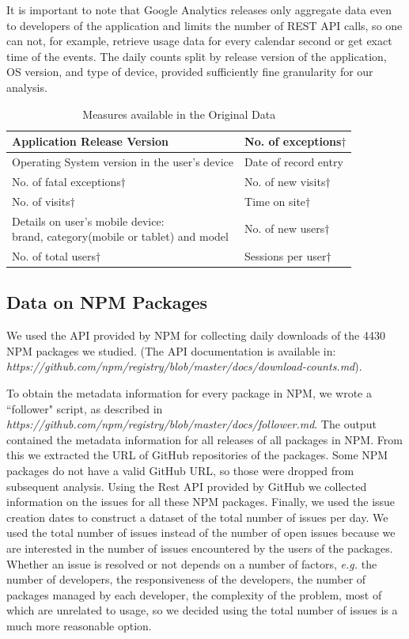 \documentclass[smallextended]{svjour3}       %
\begin{document}
It is important to note that Google Analytics releases only
aggregate data even to developers of the application and limits the
number of REST API calls, so one can not, for example, retrieve
usage data for every calendar second or get exact time of the
events. The daily counts split by release version of
the application, OS version, and type of device, provided
sufficiently fine granularity for our analysis. 
\begin{table}
\caption{Measures available in the Original Data}\label{t:measures}
\begin{tabular}{|p{6.5cm}|p{4cm}|}\hline
Application Release Version & No. of exceptions$\dagger$\\\hline
Operating System version in the user's device &Date of record entry\\\hline
No. of fatal exceptions$\dagger$& No. of new visits$\dagger$\\\hline
No. of visits$\dagger$ & Time on site$\dagger$\\\hline
\pbox{6cm}{Details on user's mobile device:\\ brand, category(mobile or tablet) and model} & No. of new users$\dagger$\\\hline
No. of total users$\dagger$& Sessions per user$\dagger$\\ \hline
\end{tabular}
\vspace{-10pt}
\end{table}

\subsection{Data on NPM Packages}

We used the API provided by NPM for collecting daily downloads of the 4430 NPM packages we studied. (The API documentation is available in: \textit{https://github.com/npm/registry/blob/master/docs/download-counts.md}).

To obtain the metadata information for every package in NPM, we wrote a ``follower" script, as described in 
\\ \textit{https://github.com/npm/registry/blob/master/docs/follower.md}.
The output contained the metadata information for all releases of all packages in NPM. From this we extracted the URL of GitHub repositories of the packages. Some NPM packages do not have a valid GitHub URL, so those were dropped from subsequent analysis. Using the Rest API provided by GitHub we collected information on the issues for all these NPM packages. Finally, we used the issue creation dates to construct a dataset of the total number of issues per day. We used the total number of issues instead of the number of open issues because we are interested in the number of issues encountered by the users of the packages. Whether an issue is resolved or not depends on a number of factors, \emph{e.g.} the number of developers, the responsiveness of the developers, the number of packages managed by each developer, the complexity of the problem, most of which are unrelated to usage, so we decided using the total number of issues is a much more reasonable option.
\end{document}
